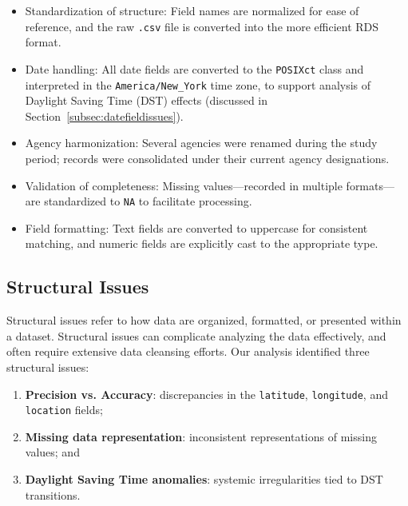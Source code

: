 \documentclass[linenumber]{jdsart}
\begin{document}
\begin{itemize}[left=1.5em, itemsep=0.25\baselineskip]
  \item Standardization of structure: Field names are normalized for ease of reference, and the raw
  \texttt{.csv} file is converted into the more efficient RDS format.

  \item Date handling: All date fields are converted to the \texttt{POSIXct}
class and interpreted in the \texttt{America/New\_York} time zone,
to support analysis of Daylight Saving Time (DST)
effects (discussed in Section~\ref{subsec:datefieldissues}).

  \item Agency harmonization: Several agencies were renamed during the study period; records were
  consolidated under their current agency designations.

  \item Validation of completeness: Missing values—recorded in multiple 
  formats—are standardized to \texttt{NA} to facilitate processing. 

  \item Field formatting: Text fields are converted to uppercase for 
  consistent matching, and numeric fields are explicitly cast to the appropriate type.
\end{itemize}


\subsection{Structural Issues}
\label{sec:structural}
Structural issues refer to how data are organized, formatted, 
or presented within a dataset. Structural issues can complicate analyzing 
the data effectively, and often require extensive data cleansing efforts. Our 
analysis identified three structural issues:
\begin{enumerate}
    \item \textbf{Precision vs. Accuracy}: discrepancies in the 
    \texttt{latitude}, \texttt{longitude}, and \texttt{location} fields;
    \item \textbf{Missing data representation}: inconsistent 
    representations of missing values; and
    \item \textbf{Daylight Saving Time anomalies}: systemic 
    irregularities tied to DST transitions.
\end{enumerate}
\end{document}
